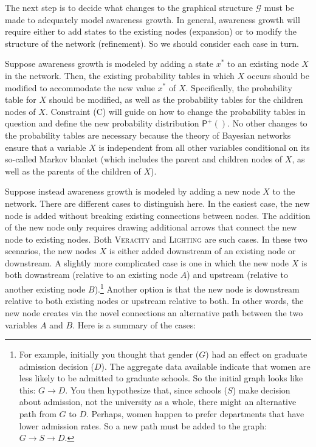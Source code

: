 \documentclass[
  11pt,
  dvipsnames,enabledeprecatedfontcommands]{scrartcl}
\newcommand{\ppr}[2]{\ensuremath{\mathsf{P}^{#1}(#2)}}
\begin{document}
The next step is to decide what changes to the graphical structure
\(\mathcal{G}\) must be made to adequately model awareness growth. In
general, awareness growth will require either to add states to the
existing nodes (expansion) or to modify the structure of the network
(refinement). So we should consider each case in turn.

Suppose awareness growth is modeled by adding a state \(x^*\) to an
existing node \(X\) in the network. Then, the existing probability
tables in which \(X\) occurs should be modified to accommodate the new
value \(x^*\) of \(X\). Specifically, the probability table for \(X\)
should be modified, as well as the probability tables for the children
nodes of \(X\). Constraint (C) will guide on how to change the
probability tables in question and define the new probability
distribution \(\ppr{+}{}\). No other changes to the probability tables
are necessary because the theory of Bayesian networks ensure that a
variable \(X\) is independent from all other variables conditional on
its so-called Markov blanket (which includes the parent and children
nodes of \(X\), as well as the parents of the children of \(X\)).

Suppose instead awareness growth is modeled by adding a new node \(X\)
to the network. There are different cases to distinguish here. In the
easiest case, the new node is added without breaking existing
connections between nodes. The addition of the new node only requires
drawing additional arrows that connect the new node to existing nodes.
Both \textsc{Veracity} and \textsc{Lighting} are such cases. In these
two scenarios, the new nodes \(X\) is either added downstream of an
existing node or downstream. A slightly more complicated case is one in
which the new node \(X\) is both downstream (relative to an existing
node \(A\)) and upstream (relative to another existing node
\(B\)).\footnote{For example, initially you thought that gender (\(G\))
  had an effect on graduate admission decision (\(D\)). The aggregate
  data available indicate that women are less likely to be admitted to
  graduate schools. So the initial graph looks like this:
  \(G \rightarrow D\). You then hypothesize that, since schools (\(S\))
  make decision about admission, not the university as a whole, there
  might an alternative path from \(G\) to \(D\). Perhaps, women happen
  to prefer departments that have lower admission rates. So a new path
  must be added to the graph: \(G \rightarrow S \rightarrow D\).}
Another option is that the new node is downstream relative to both
existing nodes or upstream relative to both. In other words, the new
node creates via the novel connections an alternative path between the
two variables \(A\) and \(B\). Here is a summary of the cases:
\end{document}

